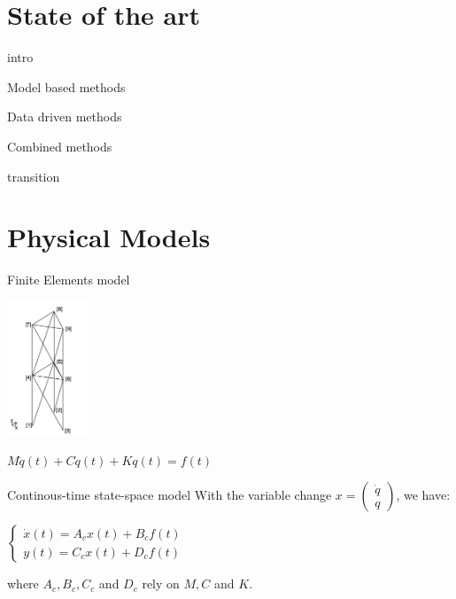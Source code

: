 \documentclass{beamer}
\begin{document}
\section{State of the art}


\begin{frame}{intro}
\end{frame}


\begin{frame}{Model based methods}
\end{frame}


\begin{frame}{Data driven methods}
\end{frame}


\begin{frame}{Combined methods}
\end{frame}


\begin{frame}{transition}
\end{frame}


\section{Physical Models}


\begin{frame}{Finite Elements model}

\begin{center}
\includegraphics[height=4cm]{images/finite_element.png}

$M \ddot{q}(t) + C \dot{q}(t) + K q(t) = f(t)$
\end{center}

\end{frame}


\begin{frame}{Continous-time state-space model}
With the variable change $x =
\begin{pmatrix}
\dot{q} \\
q
\end{pmatrix}$, we have:


\begin{center}
$\left\{
\begin{array}{ll}
\dot{x}(t) = A_cx(t) + B_cf(t) \\
y(t) = C_cx(t) + D_cf(t)
\end{array}
\right.$
\end{center}

where $A_c, B_c, C_c$ and $D_c$ rely on $M, C$ and $K$.

\end{frame}
\end{document}
